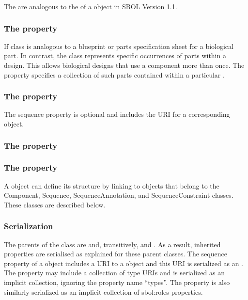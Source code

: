 The  are analogous to the  of a  object in SBOL Version 1.1. 


\subsubsection*{The  property}
\label{sec:components}

If  class is analogous to a blueprint or parts specification sheet for a biological part. In contrast, the  class represents specific occurrences of parts within a design.  This allows biological designs that use a component more than once.
The  property specifies a collection of such parts contained within a particular .


\subsubsection*{The  property}
\label{sec:sequence}
The sequence property is optional and includes the URI for a corresponding  object.

\subsubsection*{The  property}
\label{sec:sequenceConstraint}


\subsubsection*{The  property}
\label{sec:sequenceAnnotation}


A  object can define its structure by linking to objects that belong to the Component, Sequence, SequenceAnnotation, and SequenceConstraint classes. These classes are described below.

\subsubsection*{Serialization}
The parents of the  class are  and, transitively,  and . As a result, inherited properties are serialised as explained for these parent classes. The sequence property of a  object includes a URI to a  object and this URI is serialized as an . The  property may include a collection of type URIs and is serialized as an implicit collection, ignoring the property name ``types''. The  property is also similarly serialized as an implicit collection of sbol:roles properties.

